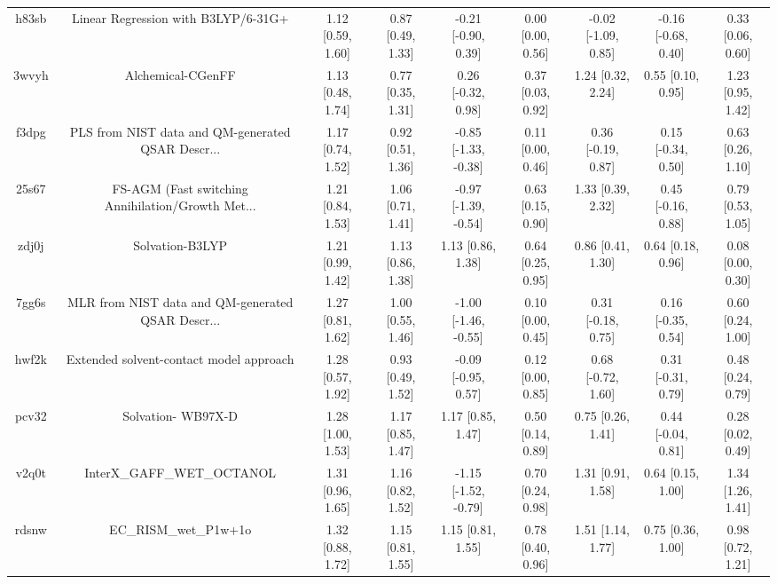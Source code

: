 \documentclass{article}
\begin{document}
\begin{center}
\begin{longtable}{|ccccccccc|}
 h83sb &                Linear Regression with B3LYP/6-31G+ &  1.12 [0.59, 1.60] &  0.87 [0.49, 1.33] &   -0.21 [-0.90, 0.39] &  0.00 [0.00, 0.56] &  -0.02 [-1.09, 0.85] &  -0.16 [-0.68, 0.40] &     0.33 [0.06, 0.60] \\
 3wvyh &                                  Alchemical-CGenFF &  1.13 [0.48, 1.74] &  0.77 [0.35, 1.31] &    0.26 [-0.32, 0.98] &  0.37 [0.03, 0.92] &    1.24 [0.32, 2.24] &    0.55 [0.10, 0.95] &     1.23 [0.95, 1.42] \\
 f3dpg &  PLS from NIST data and QM-generated QSAR Descr... &  1.17 [0.74, 1.52] &  0.92 [0.51, 1.36] &  -0.85 [-1.33, -0.38] &  0.11 [0.00, 0.46] &   0.36 [-0.19, 0.87] &   0.15 [-0.34, 0.50] &     0.63 [0.26, 1.10] \\
 25s67 &  FS-AGM (Fast switching Annihilation/Growth Met... &  1.21 [0.84, 1.53] &  1.06 [0.71, 1.41] &  -0.97 [-1.39, -0.54] &  0.63 [0.15, 0.90] &    1.33 [0.39, 2.32] &   0.45 [-0.16, 0.88] &     0.79 [0.53, 1.05] \\
 zdj0j &                                    Solvation-B3LYP &  1.21 [0.99, 1.42] &  1.13 [0.86, 1.38] &     1.13 [0.86, 1.38] &  0.64 [0.25, 0.95] &    0.86 [0.41, 1.30] &    0.64 [0.18, 0.96] &     0.08 [0.00, 0.30] \\
 7gg6s &  MLR from NIST data and QM-generated QSAR Descr... &  1.27 [0.81, 1.62] &  1.00 [0.55, 1.46] &  -1.00 [-1.46, -0.55] &  0.10 [0.00, 0.45] &   0.31 [-0.18, 0.75] &   0.16 [-0.35, 0.54] &     0.60 [0.24, 1.00] \\
 hwf2k &            Extended solvent-contact model approach &  1.28 [0.57, 1.92] &  0.93 [0.49, 1.52] &   -0.09 [-0.95, 0.57] &  0.12 [0.00, 0.85] &   0.68 [-0.72, 1.60] &   0.31 [-0.31, 0.79] &     0.48 [0.24, 0.79] \\
 pcv32 &                                 Solvation- WB97X-D &  1.28 [1.00, 1.53] &  1.17 [0.85, 1.47] &     1.17 [0.85, 1.47] &  0.50 [0.14, 0.89] &    0.75 [0.26, 1.41] &   0.44 [-0.04, 0.81] &     0.28 [0.02, 0.49] \\
 v2q0t &                         InterX\_GAFF\_WET\_OCTANOL &  1.31 [0.96, 1.65] &  1.16 [0.82, 1.52] &  -1.15 [-1.52, -0.79] &  0.70 [0.24, 0.98] &    1.31 [0.91, 1.58] &    0.64 [0.15, 1.00] &     1.34 [1.26, 1.41] \\
 rdsnw &                              EC\_RISM\_wet\_P1w+1o &  1.32 [0.88, 1.72] &  1.15 [0.81, 1.55] &     1.15 [0.81, 1.55] &  0.78 [0.40, 0.96] &    1.51 [1.14, 1.77] &    0.75 [0.36, 1.00] &     0.98 [0.72, 1.21] \\

\end{longtable}
\end{center}
\end{document}
